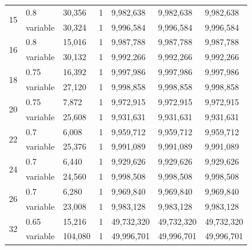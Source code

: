\documentclass{sig-alternate}
\begin{document}
\begin{table}
\begin{tabular}{|l|l|l|l|l|l|l|}
\multirow{2}{*}{15}&  0.8&            30,356&             1&      9,982,638&          9,982,638&          9,982,638\\
&                     variable&       30,324&             1&      9,996,584&          9,996,584&          9,996,584\\ \hline
\multirow{2}{*}{16}&  0.8&            15,016&             1&      9,987,788&          9,987,788&          9,987,788\\
&                     variable&       30,132&             1&      9,992,266&          9,992,266&          9,992,266\\ \hline
\multirow{2}{*}{18}&  0.75&           16,392&             1&      9,997,986&          9,997,986&          9,997,986\\
&                     variable&       27,120&             1&      9,998,858&          9,998,858&          9,998,858\\ \hline
\multirow{2}{*}{20}&  0.75&           7,872&              1&      9,972,915&          9,972,915&          9,972,915\\
&                     variable&       25,608&             1&      9,931,631&          9,931,631&          9,931,631\\ \hline
\multirow{2}{*}{22}&  0.7&            6,008&              1&      9,959,712&          9,959,712&          9,959,712\\
&                     variable&       25,376&             1&      9,991,089&          9,991,089&          9,991,089\\ \hline
\multirow{2}{*}{24}&  0.7&            6,440&              1&      9,929,626&          9,929,626&          9,929,626\\
&                     variable&       24,560&             1&      9,998,508&          9,998,508&          9,998,508\\ \hline
\multirow{2}{*}{26}&  0.7&            6,280&              1&      9,969,840&          9,969,840&          9,969,840\\
&                     variable&       23,008&             1&      9,983,128&          9,983,128&          9,983,128\\ \hline
\multirow{2}{*}{32}&  0.65&           15,216&             1&      49,732,320&         49,732,320&         49,732,320\\
&                     variable&       104,080&            1&      49,996,701&         49,996,701&         49,996,701\\
\hline\end{tabular}
\label{table:bestsol}
\end{table}
\end{document}
